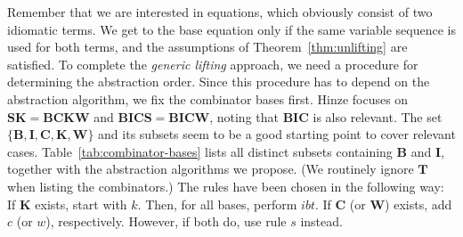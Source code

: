 Remember that we are interested in equations, which obviously consist of two
idiomatic terms.
We get to the base equation only if the same variable sequence is used for both
terms, and the assumptions of Theorem~\ref{thm:unlifting} are satisfied.
To complete the \emph{generic lifting} approach, we need a procedure for
determining the abstraction order.
Since this procedure has to depend on the abstraction algorithm, we fix the
combinator bases first.
Hinze focuses on $\mathbf{SK = BCKW}$ and $\mathbf{BICS = BICW}$, noting
that $\mathbf{BIC}$ is also relevant.
The set $\{\mathbf{B,I,C,K,W}\}$ and its subsets seem to be a good starting
point to cover relevant cases.
Table~\ref{tab:combinator-bases} lists all distinct subsets containing
$\mathbf{B}$ and $\mathbf{I}$, together with the abstraction algorithms we
propose.
(We routinely ignore $\mathbf{T}$ when listing the combinators.)
The rules have been chosen in the following way:
If $\mathbf{K}$ exists, start with $k$.
Then, for all bases, perform $ibt$.
If $\mathbf{C}$ (or $\mathbf{W}$) exists, add $c$ (or $w$), respectively.
However, if both do, use rule $s$ instead.

\todo
